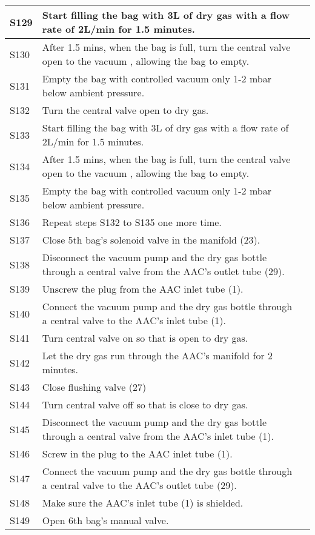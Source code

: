 \begin{longtable} {|m{}|m{}|m{}|}
S129 & Start filling the bag with 3L of dry gas with a flow rate of 2L/min for 1.5 minutes. & \\ \hline
S130 & After 1.5 mins, when the bag is full, turn the central valve open to the vacuum , allowing the bag to empty. & \\ \hline
S131 & Empty the bag with controlled vacuum only 1-2 mbar below ambient pressure. & \\ \hline
S132 & Turn the central valve open to dry gas. & \\ \hline
S133 & Start filling the bag with 3L of dry gas with a flow rate of 2L/min for 1.5 minutes. & \\ \hline
S134 & After 1.5 mins, when the bag is full, turn the central valve open to the vacuum , allowing the bag to empty. & \\ \hline
S135 & Empty the bag with controlled vacuum only 1-2 mbar below ambient pressure. & \\ \hline
S136 & Repeat steps S132 to S135 one more time. & \\ \hline
S137 & Close 5th bag's solenoid valve in the manifold (23). & \\ \hline
S138 & Disconnect the vacuum pump and the dry gas bottle through a central valve from the AAC's outlet tube (29). & \\ \hline
S139 & Unscrew the plug from the AAC inlet tube (1). & \\ \hline
S140 & Connect the vacuum pump and the dry gas bottle through a central valve to the AAC's inlet tube (1). & \\ \hline
S141 & Turn central valve on so that is open to dry gas. & \\ \hline
S142 & Let the dry gas run through the AAC's manifold for 2 minutes. & \\ \hline
S143 & Close flushing valve (27) & \\ \hline
S144 & Turn central valve off so that is close to dry gas. & \\ \hline
S145 & Disconnect the vacuum pump and the dry gas bottle through a central valve from the AAC's inlet tube (1). & \\ \hline
S146 & Screw in the plug to the AAC inlet tube (1). & \\ \hline
S147 & Connect the vacuum pump and the dry gas bottle through a central valve to the AAC's outlet tube (29). & \\ \hline
S148 & Make sure the AAC's inlet tube (1) is shielded. & \\ \hline
S149 & Open 6th bag's manual valve. & \\ \hline

\end{longtable}
